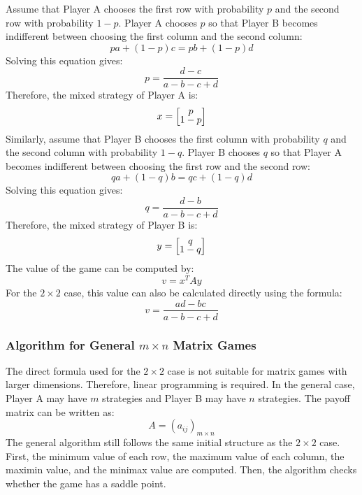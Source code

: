 \documentclass[12pt,a4paper]{article}
\begin{document}
Assume that Player A chooses the first row with probability \(p\) and the second row with probability \(1-p\). Player A chooses \(p\) so that Player B becomes indifferent between choosing the first column and the second column:
\[
pa + (1-p)c = pb + (1-p)d
\]
Solving this equation gives:
\[
p = \frac{d-c}{a-b-c+d}
\]
\vspace{0.15cm}
Therefore, the mixed strategy of Player A is:
\vspace{0.15cm}
\[
x =
\begingroup
\renewcommand{\arraystretch}{0.7}
\begin{bmatrix}
p \\
1-p
\end{bmatrix}
\endgroup
\]
\vspace{0.15cm}
Similarly, assume that Player B chooses the first column with probability \(q\) and the second column with probability \(1-q\). Player B chooses \(q\) so that Player A becomes indifferent between choosing the first row and the second row:
\[
qa + (1-q)b = qc + (1-q)d
\]
Solving this equation gives:
\[
q = \frac{d-b}{a-b-c+d}
\]
\vspace{0.15cm}
Therefore, the mixed strategy of Player B is:
\vspace{0.1cm}
\[
y =
\begingroup
\renewcommand{\arraystretch}{0.7}
\begin{bmatrix}
q \\
1-q
\end{bmatrix}
\endgroup
\]
The value of the game can be computed by:
\[
v = x^T A y
\]
For the \(2 \times 2\) case, this value can also be calculated directly using the formula:
\vspace{0.1cm}
\[
v = \frac{ad-bc}{a-b-c+d}
\] \cite{thie2008}
\subsubsection{Algorithm for General \(m \times n\) Matrix Games}

The direct formula used for the \(2 \times 2\) case is not suitable for matrix games with larger dimensions. Therefore, linear programming is required. In the general case, Player A may have \(m\) strategies and Player B may have \(n\) strategies. The payoff matrix can be written as:
\[
A = (a_{ij})_{m \times n}
\]
The general algorithm still follows the same initial structure as the \(2 \times 2\) case. First, the minimum value of each row, the maximum value of each column, the maximin value, and the minimax value are computed. Then, the algorithm checks whether the game has a saddle point.
\end{document}
